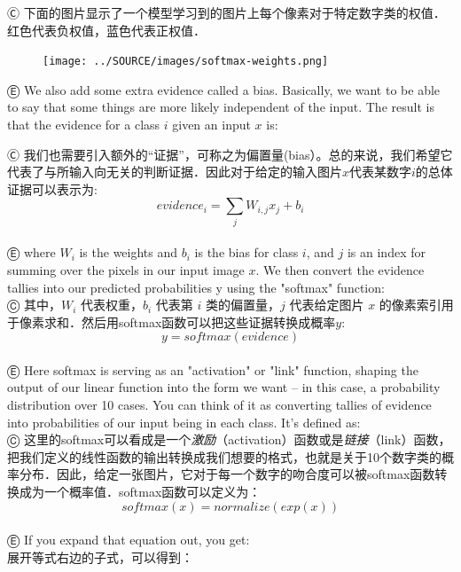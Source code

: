 Ⓒ 下面的图片显示了一个模型学习到的图片上每个像素对于特定数字类的权值．红色代表负权值，蓝色代表正权值．

\begin{figure}[htbp]
\centering
\texttt{[image: ../SOURCE/images/softmax-weights.png]}
\caption{}
\end{figure}

Ⓔ We also add some extra evidence called a bias. Basically, we want to be able to say that some things are more likely independent of the input. The result is that the evidence for a class $i$ given an input $x$ is:

Ⓒ 我们也需要引入额外的“证据”，可称之为偏置量(bias）。总的来说，我们希望它代表了与所输入向无关的判断证据．因此对于给定的输入图片$x$代表某数字$i$的总体证据可以表示为:
\begin{equation}
evidence_i = \sum_j{W_{i,j}}x_j+b_i
\end{equation}\\
Ⓔ where $W_i$ is the weights and $b_i$ is the bias for class $i$, and $j$ is an index for summing over the pixels in our input image $x$. We then convert the evidence tallies into our predicted probabilities y using the "softmax" function:\\
Ⓒ 其中，$W_i$ 代表权重，$b_i$ 代表第 $i$ 类的偏置量，$j$ 代表给定图片 $x$ 的像素索引用于像素求和．然后用softmax函数可以把这些证据转换成概率$y$:\\
\begin{equation}
y = softmax(evidence)
\end{equation}\\
Ⓔ Here softmax is serving as an "activation" or "link" function, shaping the output of our linear function into the form we want -- in this case, a probability distribution over 10 cases. You can think of it as converting tallies of evidence into probabilities of our input being in each class. It's defined as:\\
Ⓒ 这里的softmax可以看成是一个\emph{激励}（activation）函数或是\emph{链接}（link）函数，把我们定义的线性函数的输出转换成我们想要的格式，也就是关于10个数字类的概率分布．因此，给定一张图片，它对于每一个数字的吻合度可以被softmax函数转换成为一个概率值．softmax函数可以定义为：\\
\begin{equation}
softmax(x) = normalize(exp(x))
\end{equation}\\
Ⓔ If you expand that equation out, you get:\\
展开等式右边的子式，可以得到：\\
